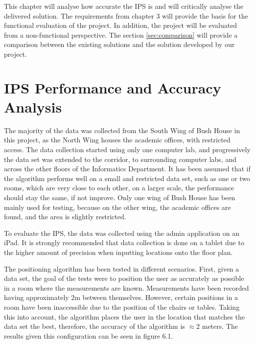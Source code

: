 This chapter will analyse how accurate the IPS is and will critically analyse the delivered solution. The requirements from chapter 3 will provide the basis for the functional evaluation of the project. In addition, the project will be evaluated from a non-functional perspective. The section \ref{sec:comparison} will provide a comparison between the existing solutions and the solution developed by our project.

\section{IPS Performance and Accuracy Analysis}
\label{sec:accuracy}

The majority of the data was collected from the South Wing of Bush House in this project, as the North Wing houses the academic offices, with restricted access. The data collection started using only one computer lab, and progressively the data set was extended to the corridor, to surrounding computer labs, and across the other floors of the Informatics Department. It has been assumed that if the algorithm performs well on a small and restricted data set, such as one or two rooms, which are very close to each other, on a larger scale, the performance should stay the same, if not improve. Only one wing of Bush House has been mainly used for testing, because on the other wing, the academic offices are found, and the area is slightly restricted. 

To evaluate the IPS, the data was collected using the admin application on an iPad. It is strongly recommended that data collection is done on a tablet due to the higher amount of precision when inputting locations onto the floor plan.

The positioning algorithm has been tested in different scenarios. First, given a data set, the goal of the tests were to position the user as accurately as possible in a room where the measurements are known. Measurements have been recorded having approximately 2m between themselves. However, certain positions in a room have been inaccessible due to the position of the chairs or tables. Taking this into account, the algorithm places the user in the location that matches the data set the best, therefore, the accuracy of the algorithm is $\approx 2$ meters. The results given this configuration can be seen in figure 6.1. 

